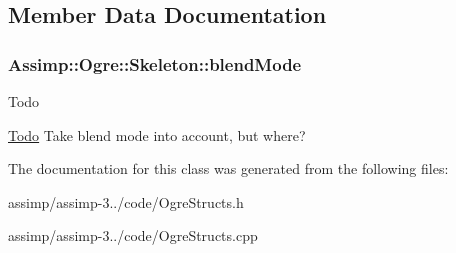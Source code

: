\subsection{Member Data Documentation}
\hypertarget{class_assimp_1_1_ogre_1_1_skeleton_a6e29d13ff5cc937a8481c96024da5b0b}{
\subsubsection[{blend\+Mode}]{ Assimp\+::\+Ogre\+::\+Skeleton\+::blend\+Mode}}\label{class_assimp_1_1_ogre_1_1_skeleton_a6e29d13ff5cc937a8481c96024da5b0b}
\begin{DoxyRefDesc}{Todo}
\item[\hyperlink{todo__todo000008}{Todo}]Take blend mode into account, but where? \end{DoxyRefDesc}


The documentation for this class was generated from the following files\+:\begin{DoxyCompactItemize}
\item 
assimp/assimp-\/3../code/Ogre\+Structs.\+h\item 
assimp/assimp-\/3../code/Ogre\+Structs.\+cpp\end{DoxyCompactItemize}
